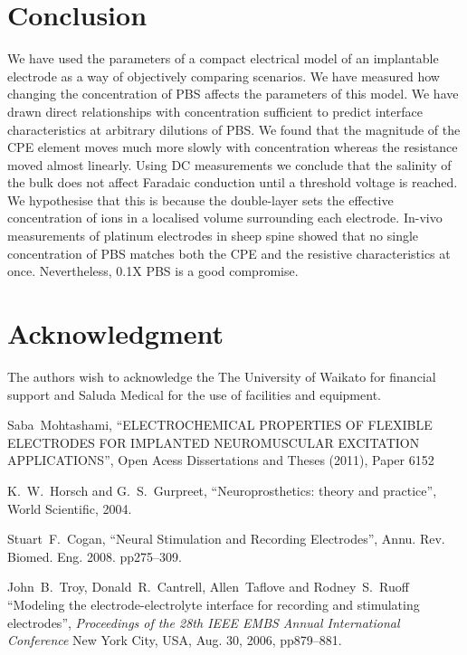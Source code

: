 \documentclass[journal, a4paper]{IEEEtran}
\begin{document}
{\section{Conclusion}

We have used the parameters of a compact electrical model of an implantable electrode as a way of objectively comparing scenarios.
We have measured how changing the concentration of PBS affects the parameters of this model.
We have drawn direct relationships with concentration sufficient to predict interface characteristics at arbitrary dilutions of PBS.
We found that the magnitude of the CPE element moves much more slowly with concentration whereas the resistance moved almost linearly.
Using DC measurements we conclude that the salinity of the bulk does not affect Faradaic conduction until a threshold voltage is reached. We hypothesise that this is because the double-layer sets the effective concentration of ions in a localised volume surrounding each electrode. In-vivo measurements of platinum electrodes in sheep spine showed that no single concentration of PBS matches both the CPE and the resistive characteristics at once. Nevertheless, 0.1X PBS is a good compromise.

\section*{Acknowledgment}
The authors wish to acknowledge the The University of Waikato for financial support and Saluda Medical for the use of facilities and equipment.

\begin{thebibliography}{99}

    Saba~Mohtashami,
    ``ELECTROCHEMICAL PROPERTIES OF FLEXIBLE ELECTRODES FOR IMPLANTED NEUROMUSCULAR EXCITATION APPLICATIONS'',
    Open Acess Dissertations and Theses (2011), Paper 6152

    K.~W.~Horsch and G.~S.~Gurpreet,
    ``Neuroprosthetics: theory and practice'',
    World Scientific, 2004.

    Stuart~F.~Cogan,
    ``Neural Stimulation and Recording Electrodes'',
    Annu. Rev. Biomed. Eng. 2008. pp275--309.

    John~B.~Troy, Donald~R.~Cantrell, Allen~Taflove and Rodney~S.~Ruoff
    ``Modeling the electrode-electrolyte interface for recording and stimulating electrodes'',
    {\em Proceedings of the 28th IEEE EMBS Annual International Conference}
    New York City, USA, Aug. 30, 2006, pp879--881.


\end{thebibliography}}
\end{document}
